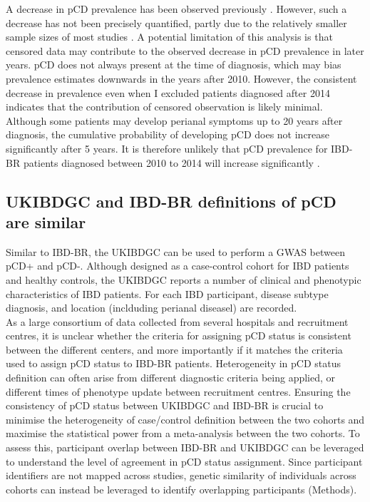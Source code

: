     A decrease in pCD prevalence has been observed previously \cite{Park2019-kj}. However, such a decrease has not been precisely quantified, partly due to the relatively smaller sample sizes of most studies \cite{Brochard2022-kz,Bruckner2018-ag,Gottgens2017-df,Tsai2022-kz}. A potential limitation of this analysis is that censored data may contribute to the observed decrease in pCD prevalence in later years. pCD does not always present at the time of diagnosis, which may bias prevalence estimates downwards in the years after 2010. However, the consistent decrease in prevalence even when I excluded patients diagnosed after 2014 indicates that the contribution of censored observation is likely minimal. Although some patients may develop perianal symptoms up to 20 years after diagnosis, the cumulative probability of developing pCD does not increase significantly after 5 years. It is therefore unlikely that pCD prevalence for IBD-BR patients diagnosed between 2010 to 2014 will increase significantly \cite{Tsai2022-kz}.

    \subsection{UKIBDGC and IBD-BR definitions of pCD are similar}
    Similar to IBD-BR, the UKIBDGC can be used to perform a GWAS between pCD+ and pCD-. Although designed as a case-control cohort for IBD patients and healthy controls, the UKIBDGC reports a number of clinical and phenotypic characteristics of IBD patients. For each IBD participant, disease subtype diagnosis, and location (inclduding perianal diseasel) are recorded. \\

As a large consortium of data collected from several hospitals and recruitment centres, it is unclear whether the criteria for assigning pCD status is consistent between the different centers, and more importantly if it matches the criteria used to assign pCD status to IBD-BR patients. Heterogeneity in pCD status definition can often arise from different diagnostic criteria being applied, or different times of phenotype update between recruitment centres. Ensuring the consistency of pCD status between UKIBDGC and IBD-BR is crucial to minimise the heterogeneity of case/control definition between the two cohorts and maximise the statistical power from a meta-analysis between the two cohorts. 
To assess this, participant overlap between IBD-BR and UKIBDGC can be leveraged to understand the level of agreement in pCD status assignment. Since participant identifiers are not mapped across studies, genetic similarity of individuals across cohorts can instead be leveraged to identify overlapping participants (Methods).\\

